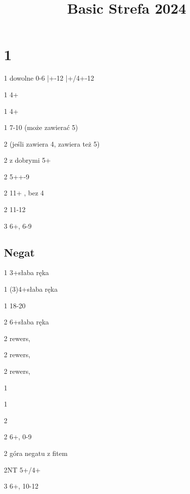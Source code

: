 \documentclass[12pt, a4paper]{article}
\title{\vspace{-2.5cm}Basic Strefa 2024}
\author{}
\date{}
\newcommand*{\orr}{\quad|\quad}
\begin{document}
\maketitle

\section*{1\clubs}

\sequence{{1\clubs}}
\begin{options}[2]
    \item[1\diams] dowolne 0-6 \orr 6+-12 \orr 5+/4+-12
    \item[1\hearts] 4+ \fonce
    \item[1\spades] 4+ \fonce  
    \item[1\nt] 7-10 \bal (może zawierać 5\diams) 
    \item[2\clubs] \gf (jeśli zawiera 4\major, zawiera też 5\clubs)
    \item[2\diams] \gf z dobrymi 5+\diams
    \item[2\hearts] 5++-9
    \item[2\spades] 11+ \bal, bez 4\major
    \item[2\nt] 11-12 \bal
    \item[3\clubs] 6+\clubs, 6-9   
\end{options}

\subsection*{Negat}

\sequence{{1\clubs}{1\diams}}
\begin{options}[1]
    \item[1\hearts] 3+\hearts słaba ręka
    \item[1\spades] (3)4+\spades słaba ręka
    \item[1\nt] 18-20 \bal
    \item[2\clubs] 6+\clubs słaba ręka
    \item[2\diams] rewers, \fonce
    \item[2\hearts] rewers, \fonce
    \item[2\spades] rewers, \fonce
\end{options}

\sequence{{1\clubs}{1\diams}{1\major}}
\begin{options}[2]
    \item[1\spades] \nf
    \item[1\nt] \nf
    \item[2\clubs] \nf
    \item[2\diams] 6+\diams, 0-9
    \item[2\major] góra negatu z fitem
    \item[2NT] 5+/4+ \minor \imp
    \item[3\diams] 6+\diams, 10-12 
\end{options}
\end{document}
